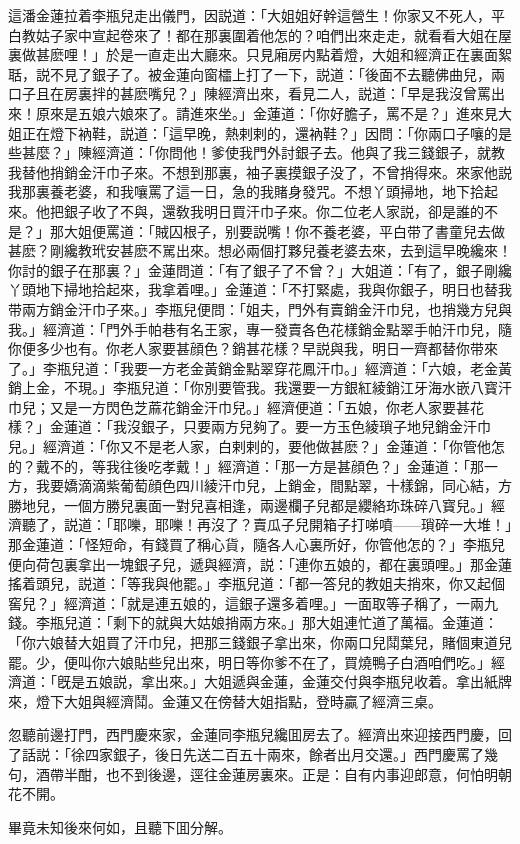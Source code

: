 這潘金蓮拉着李瓶兒走出儀門，因説道：「大姐姐好幹這營生！你家又不死人，平白教姑子家中宣起卷來了！都在那裏圍着他怎的？咱們出來走走，就看看大姐在屋裏做甚麽哩！」於是一直走出大廳來。只見廂房内點着燈，大姐和經濟正在裏面絮聒，説不見了銀子了。被金蓮向窗櫺上打了一下，説道：「後面不去聽佛曲兒，兩口子且在房裏拌的甚麽嘴兒？」陳經濟出來，看見二人，説道：「早是我沒曾罵出來！原來是五娘六娘來了。請進來坐。」金蓮道：「你好膽子，罵不是？」進來見大姐正在燈下衲鞋，説道：「這早晚，熱剌剌的，還衲鞋？」因問：「你兩口子嚷的是些甚麼？」陳經濟道：「你問他！爹使我門外討銀子去。他與了我三錢銀子，就教我替他捎銷金汗巾子來。不想到那裏，袖子裏摸銀子没了，不曾捎得來。來家他説我那裏養老婆，和我嚷罵了這一日，急的我賭身發咒。不想丫頭掃地，地下拾起來。他把銀子收了不與，還敎我明日買汗巾子來。你二位老人家説，卻是誰的不是？」那大姐便罵道：「賊囚根子，别要説嘴！你不養老婆，平白带了書童兒去做甚麽？剛纔教玳安甚麽不駡出來。想必兩個打夥兒養老婆去來，去到這早晚纔來！你討的銀子在那裏？」金蓮問道：「有了銀子了不曾？」大姐道：「有了，銀子剛纔丫頭地下掃地拾起來，我拿着哩。」金蓮道：「不打緊處，我與你銀子，明日也替我带兩方銷金汗巾子來。」李瓶兒便問：「姐夫，門外有賣銷金汗巾兒，也捎幾方兒與我。」經濟道：「門外手帕巷有名王家，專一發賣各色花樣銷金點翠手帕汗巾兒，隨你便多少也有。你老人家要甚顔色？銷甚花樣？早説與我，明日一齊都替你带來了。」李瓶兒道：「我要一方老金黃銷金點翠穿花鳳汗巾。」經濟道：「六娘，老金黃銷上金，不現。」李瓶兒道：「你別要管我。我還要一方銀紅綾銷江牙海水嵌八寳汗巾兒；又是一方閃色芝蔴花銷金汗巾兒。」經濟便道：「五娘，你老人家要甚花樣？」金蓮道：「我沒銀子，只要兩方兒夠了。要一方玉色綾瑣子地兒銷金汗巾兒。」經濟道：「你又不是老人家，白剌剌的，要他做甚麽？」金蓮道：「你管他怎的？戴不的，等我往後吃孝戴！」經濟道：「那一方是甚顔色？」金蓮道：「那一方，我要嬌滴滴紫葡萄顔色四川綾汗巾兒，上銷金，間點翠，十樣錦，同心結，方勝地兒，一個方勝兒裏面一對兒喜相逢，兩邊欄子兒都是纓絡珎珠碎八寳兒。」經濟聽了，説道：「耶嚛，耶嚛！再沒了？賣瓜子兒開箱子打㖒噴——瑣碎一大堆！」那金蓮道：「怪短命，有錢買了稱心貨，隨各人心裏所好，你管他怎的？」李瓶兒便向荷包裏拿出一塊銀子兒，遞與經濟，説：「連你五娘的，都在裏頭哩。」那金蓮搖着頭兒，説道：「等我與他罷。」李瓶兒道：「都一答兒的教姐夫捎來，你又起個窖兒？」經濟道：「就是連五娘的，這銀子還多着哩。」一面取等子稱了，一兩九錢。李瓶兒道：「剩下的就與大姑娘捎兩方來。」那大姐連忙道了萬福。金蓮道：「你六娘替大姐買了汗巾兒，把那三錢銀子拿出來，你兩口兒鬦葉兒，賭個東道兒罷。少，便叫你六娘貼些兒出來，明日等你爹不在了，買燒鴨子白酒咱們吃。」經濟道：「旣是五娘説，拿出來。」大姐遞與金蓮，金蓮交付與李瓶兒收着。拿出紙牌來，燈下大姐與經濟鬦。金蓮又在傍替大姐指點，登時贏了經濟三桌。

忽聽前邊打門，西門慶來家，金蓮同李瓶兒纔囬房去了。經濟出來迎接西門慶，回了話説：「徐四家銀子，後日先送二百五十兩來，餘者出月交還。」西門慶罵了幾句，酒帶半酣，也不到後邊，逕往金蓮房裏來。正是：自有内事迎郎意，何怕明朝花不開。

畢竟未知後來何如，且聽下囬分解。

